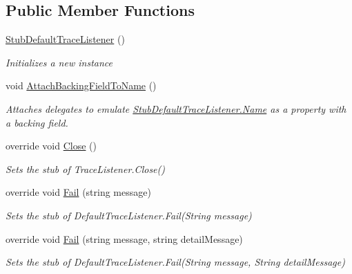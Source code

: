 \subsection*{Public Member Functions}
\begin{DoxyCompactItemize}
\item 
\hyperlink{class_system_1_1_diagnostics_1_1_fakes_1_1_stub_default_trace_listener_a449bad1cf57bfa505aedfd7b4e1c51e3}{Stub\-Default\-Trace\-Listener} ()
\begin{DoxyCompactList}\small\item\em Initializes a new instance\end{DoxyCompactList}\item 
void \hyperlink{class_system_1_1_diagnostics_1_1_fakes_1_1_stub_default_trace_listener_aaf8128d0e89bf690516d9919c037f1c7}{Attach\-Backing\-Field\-To\-Name} ()
\begin{DoxyCompactList}\small\item\em Attaches delegates to emulate \hyperlink{class_system_1_1_diagnostics_1_1_fakes_1_1_stub_default_trace_listener_a083be8848be9773b39c1e02b209b29bf}{Stub\-Default\-Trace\-Listener.\-Name} as a property with a backing field.\end{DoxyCompactList}\item 
override void \hyperlink{class_system_1_1_diagnostics_1_1_fakes_1_1_stub_default_trace_listener_a4f0ffacc01848d4b49188741a12f822f}{Close} ()
\begin{DoxyCompactList}\small\item\em Sets the stub of Trace\-Listener.\-Close()\end{DoxyCompactList}\item 
override void \hyperlink{class_system_1_1_diagnostics_1_1_fakes_1_1_stub_default_trace_listener_a6a650cfe86cb2c8dd87037852a5baa36}{Fail} (string message)
\begin{DoxyCompactList}\small\item\em Sets the stub of Default\-Trace\-Listener.\-Fail(\-String message)\end{DoxyCompactList}\item 
override void \hyperlink{class_system_1_1_diagnostics_1_1_fakes_1_1_stub_default_trace_listener_ac073b14c12c3a5f6f64903acfa735744}{Fail} (string message, string detail\-Message)
\begin{DoxyCompactList}\small\item\em Sets the stub of Default\-Trace\-Listener.\-Fail(\-String message, String detail\-Message)\end{DoxyCompactList}\item 

\end{DoxyCompactItemize}
